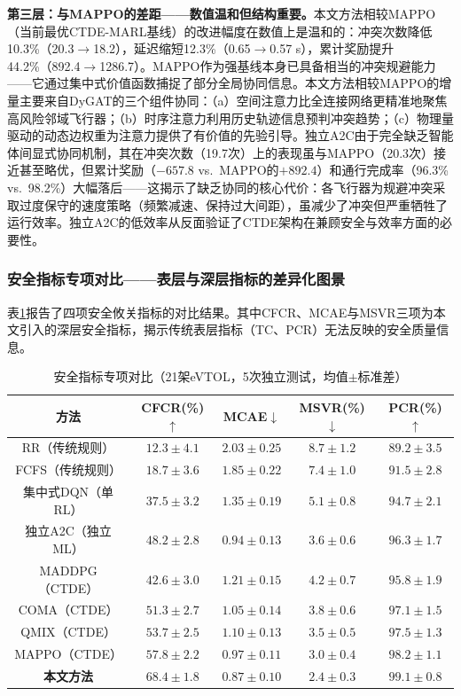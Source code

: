 \documentclass[12pt,a4paper,UTF8]{ctexart}
\begin{document}
\textbf{第三层：与MAPPO的差距——数值温和但结构重要。}本文方法相较MAPPO（当前最优CTDE-MARL基线）的改进幅度在数值上是温和的：冲突次数降低10.3\%（20.3$\to$18.2），延迟缩短12.3\%（0.65$\to$0.57 s），累计奖励提升44.2\%（892.4$\to$1286.7）。MAPPO作为强基线本身已具备相当的冲突规避能力——它通过集中式价值函数捕捉了部分全局协同信息。本文方法相较MAPPO的增量主要来自DyGAT的三个组件协同：（a）空间注意力比全连接网络更精准地聚焦高风险邻域飞行器；（b）时序注意力利用历史轨迹信息预判冲突趋势；（c）物理量驱动的动态边权重为注意力提供了有价值的先验引导。独立A2C由于完全缺乏智能体间显式协同机制，其在冲突次数（19.7次）上的表现虽与MAPPO（20.3次）接近甚至略优，但累计奖励（$-657.8$ vs.\ MAPPO的$+892.4$）和通行完成率（96.3\% vs.\ 98.2\%）大幅落后——这揭示了缺乏协同的核心代价：各飞行器为规避冲突采取过度保守的速度策略（频繁减速、保持过大间距），虽减少了冲突但严重牺牲了运行效率。独立A2C的低效率从反面验证了CTDE架构在兼顾安全与效率方面的必要性。

\subsubsection{安全指标专项对比——表层与深层指标的差异化图景}

表\ref{tab:safety_metrics}报告了四项安全攸关指标的对比结果。其中CFCR、MCAE与MSVR三项为本文引入的深层安全指标，揭示传统表层指标（TC、PCR）无法反映的安全质量信息。

\begin{table}[H]
    \centering
    \caption{安全指标专项对比（21架eVTOL，5次独立测试，均值$\pm$标准差）}
    \label{tab:safety_metrics}
    \begin{tabular}{|c|c|c|c|c|}
        \hline
        \textbf{方法} & \textbf{CFCR(\%)$\uparrow$} & \textbf{MCAE$\downarrow$} & \textbf{MSVR(\%)$\downarrow$} & \textbf{PCR(\%)$\uparrow$} \\
        \hline
        RR（传统规则） & $12.3 \pm 4.1$ & $2.03 \pm 0.25$ & $8.7 \pm 1.2$ & $89.2 \pm 3.5$ \\
        FCFS（传统规则） & $18.7 \pm 3.6$ & $1.85 \pm 0.22$ & $7.4 \pm 1.0$ & $91.5 \pm 2.8$ \\
        集中式DQN（单RL） & $37.5 \pm 3.2$ & $1.35 \pm 0.19$ & $5.1 \pm 0.8$ & $94.7 \pm 2.1$ \\
        独立A2C（独立ML） & $48.2 \pm 2.8$ & $0.94 \pm 0.13$ & $3.6 \pm 0.6$ & $96.3 \pm 1.7$ \\
        MADDPG（CTDE） & $42.6 \pm 3.0$ & $1.21 \pm 0.15$ & $4.2 \pm 0.7$ & $95.8 \pm 1.9$ \\
        COMA（CTDE） & $51.3 \pm 2.7$ & $1.05 \pm 0.14$ & $3.8 \pm 0.6$ & $97.1 \pm 1.5$ \\
        QMIX（CTDE） & $53.7 \pm 2.5$ & $1.10 \pm 0.13$ & $3.5 \pm 0.5$ & $97.5 \pm 1.3$ \\
        MAPPO（CTDE） & $57.8 \pm 2.2$ & $0.97 \pm 0.11$ & $3.0 \pm 0.4$ & $98.2 \pm 1.1$ \\
        \textbf{本文方法} & $\mathbf{68.4 \pm 1.8}$ & $\mathbf{0.87 \pm 0.10}$ & $\mathbf{2.4 \pm 0.3}$ & $\mathbf{99.1 \pm 0.8}$ \\
        \hline
    \end{tabular}
\end{table}
\end{document}
